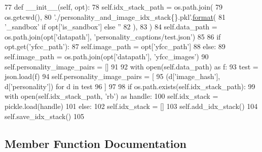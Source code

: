 \begin{DoxyCode}
77     \textcolor{keyword}{def }\_\_init\_\_(self, opt):
78         self.idx\_stack\_path = os.path.join(
79             os.getcwd(),
80             \textcolor{stringliteral}{'./personality\_and\_image\_idx\_stack\{\}.pkl'}.\hyperlink{namespaceparlai_1_1chat__service_1_1services_1_1messenger_1_1shared__utils_a32e2e2022b824fbaf80c747160b52a76}{format}(
81                 \textcolor{stringliteral}{'\_sandbox'} \textcolor{keywordflow}{if} opt[\textcolor{stringliteral}{'is\_sandbox'}] \textcolor{keywordflow}{else} \textcolor{stringliteral}{''}
82             ),
83         )
84         self.data\_path = os.path.join(opt[\textcolor{stringliteral}{'datapath'}], \textcolor{stringliteral}{'personality\_captions/test.json'})
85 
86         \textcolor{keywordflow}{if} opt.get(\textcolor{stringliteral}{'yfcc\_path'}):
87             self.image\_path = opt[\textcolor{stringliteral}{'yfcc\_path'}]
88         \textcolor{keywordflow}{else}:
89             self.image\_path = os.path.join(opt[\textcolor{stringliteral}{'datapath'}], \textcolor{stringliteral}{'yfcc\_images'})
90         self.personality\_image\_pairs = []
91 
92         with open(self.data\_path) \textcolor{keyword}{as} f:
93             test = json.load(f)
94             self.personality\_image\_pairs = [
95                 (d[\textcolor{stringliteral}{'image\_hash'}], d[\textcolor{stringliteral}{'personality'}]) \textcolor{keywordflow}{for} d \textcolor{keywordflow}{in} test
96             ]
97 
98         \textcolor{keywordflow}{if} os.path.exists(self.idx\_stack\_path):
99             with open(self.idx\_stack\_path, \textcolor{stringliteral}{'rb'}) \textcolor{keyword}{as} handle:
100                 self.idx\_stack = pickle.load(handle)
101         \textcolor{keywordflow}{else}:
102             self.idx\_stack = []
103             self.add\_idx\_stack()
104             self.save\_idx\_stack()
105 
\end{DoxyCode}


\subsection{Member Function Documentation}
\mbox{\label{classpersonality__captions_1_1worlds_1_1PersonalityAndImageGenerator_ac246d3fe0a05e842220e73ff837eb2ee}} 
